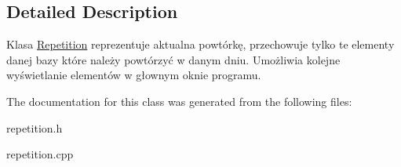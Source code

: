 \subsection{Detailed Description}
Klasa \mbox{\hyperlink{class_repetition}{Repetition}} reprezentuje aktualna powtórkę, przechowuje tylko te elementy danej bazy które należy powtórzyć w danym dniu. Umożliwia kolejne wyświetlanie elementów w głownym oknie programu. 

The documentation for this class was generated from the following files\+:\begin{DoxyCompactItemize}
\item 
repetition.\+h\item 
repetition.\+cpp\end{DoxyCompactItemize}
